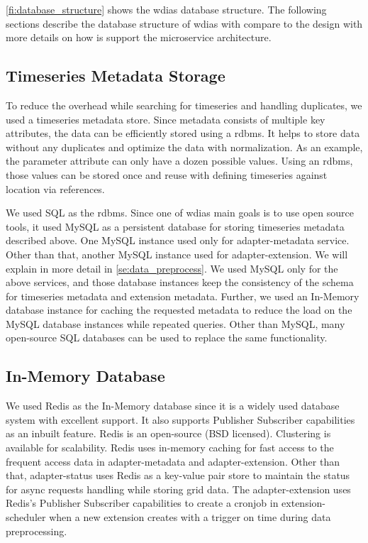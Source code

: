 \cref{fi:database_structure} shows the \acrshort{wdias} database structure.
The following sections describe the database structure of \acrshort{wdias} with compare to the design with more details on how is support the microservice architecture.

\subsection{Timeseries Metadata Storage}
\label{subse:mysql}

To reduce the overhead while searching for timeseries and handling duplicates, we used a timeseries metadata store. Since metadata consists of multiple key attributes, the data can be efficiently stored using a \acrfull{rdbms}. It helps to store data without any duplicates and optimize the data with normalization. As an example, the parameter attribute can only have a dozen possible values. Using an \acrshort{rdbms}, those values can be stored once and reuse with defining timeseries against location via references.

We used SQL as the \acrshort{rdbms}. Since one of \acrshort{wdias} main goals is to use open source tools, it used MySQL as a persistent database for storing timeseries metadata described above. One MySQL instance used only for adapter-metadata service. Other than that, another MySQL instance used for adapter-extension. We will explain in more detail in \cref{se:data_preprocess}. We used MySQL only for the above services, and those database instances keep the consistency of the schema for timeseries metadata and extension metadata. Further, we used an In-Memory database instance for caching the requested metadata to reduce the load on the MySQL database instances while repeated queries. Other than MySQL, many open-source SQL databases can be used to replace the same functionality.

\subsection{In-Memory Database}
\label{subse:redis}

We used Redis \cite{redisRedisDocumentation} as the In-Memory database since it is a widely used database system with excellent support. It also supports Publisher Subscriber capabilities as an inbuilt feature. Redis is an open-source (BSD licensed). Clustering is available for scalability. Redis uses in-memory caching for fast access to the frequent access data in adapter-metadata and adapter-extension. Other than that, adapter-status uses Redis as a key-value pair store to maintain the status for async requests handling while storing grid data. The adapter-extension uses Redis's Publisher Subscriber capabilities to create a cronjob in extension-scheduler when a new extension creates with a trigger on time during data preprocessing.

